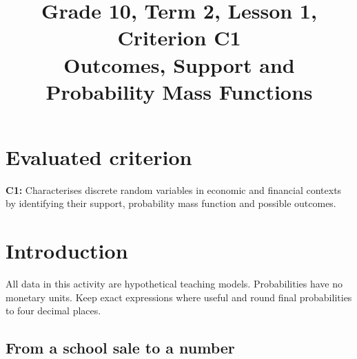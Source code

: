 \makeatletter
{}
\makeatother



\usepackage{needspace}
\setlength{\emergencystretch}{2em}
\title{Grade 10, Term 2, Lesson 1, Criterion C1\\Outcomes, Support and Probability Mass Functions}
\author{}
\date{}

\maketitle
\setcounter{tocdepth}{1}
\setcounter{secnumdepth}{2}
\label{toc}
\tableofcontents
\section*{Evaluated criterion}
\textbf{C1:} Characterises discrete random variables in economic and financial contexts by identifying their support, probability mass function and possible outcomes.
\section{Introduction}\label{sec:t2-c1-introduction}

 \vspace{5mm}

All data in this activity are hypothetical teaching models. Probabilities have no monetary units. Keep exact expressions where useful and round final probabilities to four decimal places.

\GTenHighlightLegend

\subsection{From a school sale to a number}
\label{subsec:t2-c1-from-a-school-sale-to-a-number}

